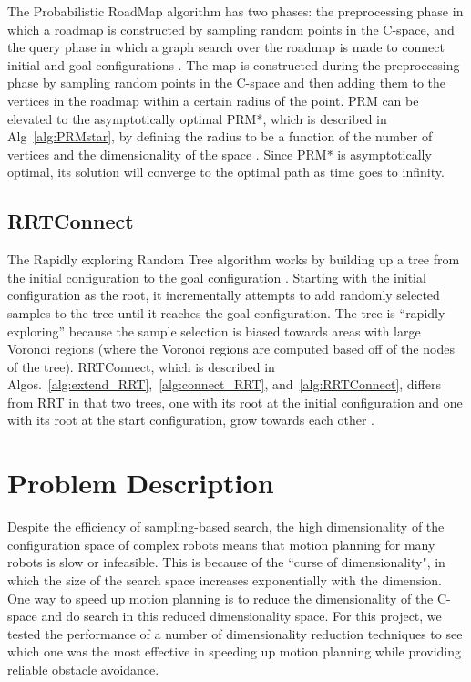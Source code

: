 \documentclass[12pt]{article}
\begin{document}
The Probabilistic RoadMap algorithm has two phases: the preprocessing phase in
which a roadmap is constructed by sampling random points in the C-space, and
the query phase in which a graph search over the roadmap is made to connect
initial and goal configurations \cite{kavraki1996prm}. The map is constructed
during the preprocessing phase by sampling random points in the C-space and
then adding them to the vertices in the roadmap within a certain radius of the
point. PRM can be elevated to the asymptotically optimal PRM*, which is
described in Alg~\ref{alg:PRMstar}, by defining the radius to be a function of
the number of vertices and the dimensionality of the space
\cite{karaman2011sampling}. Since PRM* is asymptotically optimal, its solution
will converge to the optimal path as time goes to infinity.

\subsection{RRTConnect}

The Rapidly exploring Random Tree algorithm works by building up a tree from
the initial configuration to the goal configuration \cite{lavalle1998rrt}.
Starting with the initial configuration as the root, it incrementally attempts
to add randomly selected samples to the tree until it reaches the goal
configuration.  The tree is ``rapidly exploring'' because the sample selection
is biased towards areas with large Voronoi regions (where the Voronoi regions
are computed based off of the nodes of the tree). RRTConnect, which is
described in Algos.~\ref{alg:extend_RRT},~\ref{alg:connect_RRT},
and~\ref{alg:RRTConnect}, differs from RRT in that two trees, one with its root
at the initial configuration and one with its root at the start configuration,
grow towards each other \cite{kuffner2000rrt}.

\section{Problem Description}

Despite the efficiency of sampling-based search, the high dimensionality of the
configuration space of complex robots means that motion planning for many
robots is slow or infeasible. This is because of the ``curse of dimensionality",
in which the size of the search space increases exponentially with the
dimension. One way to speed up motion planning is to reduce the dimensionality
of the C-space and do search in this reduced dimensionality space. For this
project, we tested the performance of a number of dimensionality reduction
techniques to see which one was the most effective in speeding up motion
planning while providing reliable obstacle avoidance.
\end{document}
